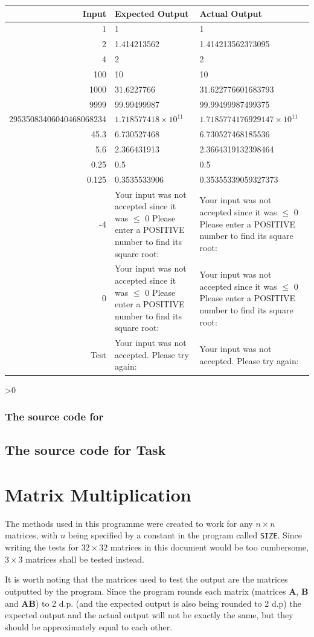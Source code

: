 \documentclass[12pt,a4paper,onesided]{report}
\newcommand{\source}{\pagebreak
	\ifnum\value{section}>0
		\subsection{The source code for \thesection}

	\else
		\section{The source code for Task \thechapter}

	\fi
	}
\begin{document}
\begin{table}[h!]
	\centering
	\begin{tabular}{rp{28ex}p{28ex}}
		\toprule
		Input & Expected Output & Actual Output\\\midrule
		1 & 1& 1\\
		2 &  1.414213562 & 1.414213562373095\\
		4 & 2 & 2\\ 
		100 & 10 & 10\\
		1000& 31.6227766 & 31.622776601683793\\
		9999& 99.99499987 & 99.99499987499375\\
	29535083406040468068234& $1.718577418\times10^{11}$&$1.7185774176929147\times10^{11}$\\
	45.3 & 6.730527468 & 6.730527468185536\\
	5.6 & 2.366431913 &2.3664319132398464\\
	0.25& 0.5 & 0.5\\
	0.125& 0.3535533906 & 0.35355339059327373\\
	-4& Your input was not accepted since it was $\leq$ 0 Please enter a POSITIVE number to find its square root:  & Your input was not accepted since it was $\leq$ 0 Please enter a POSITIVE number to find its square root:  \\
	0 & Your input was not accepted since it was $\leq$ 0 Please enter a POSITIVE number to find its square root: & Your input was not accepted since it was $\leq$ 0 Please enter a POSITIVE number to find its square root: \\
	Test& Your input was not accepted. Please try again: & Your input was not accepted. Please try again: \\
	\bottomrule
	\end{tabular}
\end{table}
\source

\chapter{Matrix Multiplication}
The methods used in this programme were created to work for any $n \times n$ matrices, with $n$ being specified by a constant in the program called \lstinline|SIZE|. Since writing the tests for $32\times32$ matrices in this document would be too cumbersome, $3\times3$ matrices shall be tested instead.

It is worth noting that the matrices used to test the output are the matrices outputted by the program. Since the program rounds each matrix (matrices $\mathbf{A}$, $\mathbf{B}$ and $\mathbf{AB}$) to 2 d.p. (and the expected output is also being rounded to 2 d.p) the expected output and the actual output will not be exactly the same, but they should be approximately equal to each other.
\end{document}
